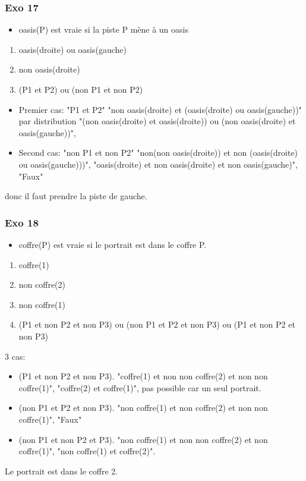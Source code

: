 \documentclass[]{book}
\theoremstyle{definition}
\begin{document}
\subsubsection*{Exo 17}
\begin{itemize}
\item oasis(P) est vraie si la piste P m\`ene \`a un oasis
\end{itemize}
 
\begin{enumerate}[P1:]
\item oasis(droite) ou oasis(gauche)
\item non oasis(droite)
\item (P1 et P2) ou (non P1 et non P2)
\end{enumerate}

\begin{itemize}
\item Premier cas: "P1 et P2" "non oasis(droite) et (oasis(droite) ou oasis(gauche))" par distribution "(non oasis(droite) et oasis(droite)) ou (non oasis(droite) et oasis(gauche))",
\item Second cas: "non P1 et non P2" "non(non oasis(droite)) et non (oasis(droite) ou oasis(gauche)))", "oasis(droite) et non oasis(droite) et non oasis(gauche)", "Faux"
\end{itemize}
donc il faut prendre la piste de gauche.

\subsubsection*{Exo 18}
\begin{itemize}
\item coffre(P) est vraie si le portrait est dans le coffre P.
\end{itemize}

\begin{enumerate}[P1:]
\item coffre(1)
\item non coffre(2)
\item non coffre(1)
\item (P1 et non P2 et non P3) ou (non P1 et P2 et non P3) ou (P1 et non P2 et non P3)
\end{enumerate}

3 cas:
\begin{itemize}
\item (P1 et non P2 et non P3). "coffre(1) et non non coffre(2) et non non coffre(1)", "coffre(2) et coffre(1)", pas possible car un seul portrait.
\item (non P1 et P2 et non P3). "non coffre(1) et non coffre(2) et non non coffre(1)", "Faux"
\item (non P1 et non P2 et P3). "non coffre(1) et non non coffre(2) et non coffre(1)", "non coffre(1) et coffre(2)".
\end{itemize}

Le portrait est dans le coffre 2.
\end{document}
